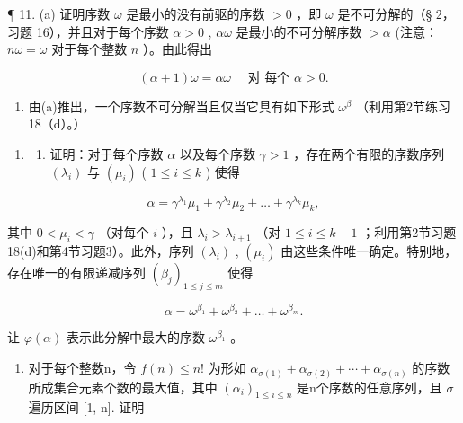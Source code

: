 ¶ 11. (a) 证明序数 \(\omega\) 是最小的没有前驱的序数 \(>0\) ，即 \(\omega\) 是不可分解的（§ 2，习题 16），并且对于每个序数 \(\alpha > 0\) , \(\alpha\omega\) 是最小的不可分解序数 \(>\alpha\) (注意： \(n\omega = \omega\) 对于每个整数 \(n\) ）。由此得出

\[
(\alpha + 1) \omega = \alpha \omega \quad \text { 对   每个 } \alpha > 0.
\]

\begin{enumerate}
\def\labelenumi{(\alph{enumi})}
\setcounter{enumi}{1}
\tightlist
\item
  由(a)推出，一个序数不可分解当且仅当它具有如下形式 \(\omega^{\beta}\) （利用第2节练习18（d）。）
\end{enumerate}

\begin{enumerate}
\def\labelenumi{\arabic{enumi}.}
\setcounter{enumi}{11}
\tightlist
\item
  \begin{enumerate}
  \def\labelenumii{(\alph{enumii})}
  \tightlist
  \item
    证明：对于每个序数 \(\alpha\) 以及每个序数 \(\gamma > 1\) ，存在两个有限的序数序列 \((\lambda_i)\) 与 \((\mu_i)\) ( \(1 \leqslant i \leqslant k\) ) 使得
  \end{enumerate}
\end{enumerate}

\[
\alpha = \gamma^ {\lambda_ {1}} \mu_ {1} + \gamma^ {\lambda_ {2}} \mu_ {2} + \dots + \gamma^ {\lambda_ {k}} \mu_ {k},
\]

其中 \(0 < \mu_i < \gamma\) （对每个 \(i\) ），且 \(\lambda_i > \lambda_{i+1}\) （对 \(1 \leqslant i \leqslant k - 1\) ；利用第2节习题18(d)和第4节习题3）。此外，序列 \((\lambda_i)\) , \((\mu_i)\) 由这些条件唯一确定。特别地，存在唯一的有限递减序列 \((\beta_j)_{1 \leqslant j \leqslant m}\) 使得

\[
\alpha = \omega^ {\beta_ {1}} + \omega^ {\beta_ {2}} + \dots + \omega^ {\beta_ {m}}.
\]

让 \(\varphi(\alpha)\) 表示此分解中最大的序数 \(\omega^{\beta_1}\) 。

\begin{enumerate}
\def\labelenumi{(\alph{enumi})}
\setcounter{enumi}{1}
\tightlist
\item
  对于每个整数n，令 \(f(n) \leqslant n!\) 为形如 \(\alpha_{\sigma(1)} + \alpha_{\sigma(2)} + \cdots + \alpha_{\sigma(n)}\) 的序数所成集合元素个数的最大值，其中 \((\alpha_i)_{1 \leqslant i \leqslant n}\) 是n个序数的任意序列，且 \(\sigma\) 遍历区间 {[}1, n{]}. 证明
\end{enumerate}

